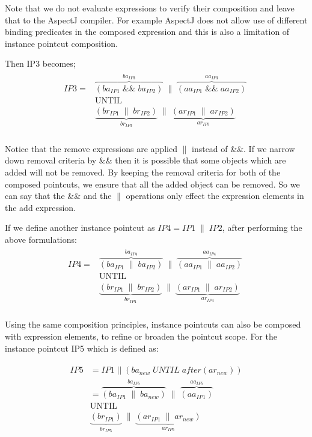 \documentclass{llncs}
\begin{document}
Note that we do not evaluate expressions to verify their composition and leave that to the AspectJ compiler. For example AspectJ does not allow use of different binding predicates in the composed expression and this is also a limitation of instance pointcut composition. 

Then IP3 becomes;
\begin{align}
\begin{split}
IP3 =& \overbrace{\left( ba_{IP1}\;\textrm{\&\&}\;ba_{IP2}\right)}^{ba_{IP3}}\;\|\;\overbrace{\left( aa_{IP1}\;\textrm{\&\&}\;aa_{IP2} \right)}^{aa_{IP3}}\;\\
&\textrm{UNTIL} \\
&\underbrace{\left( br_{IP1}\;\|\;br_{IP2}\right)}_{br_{IP3}}\;\|\;\underbrace{\left( ar_{IP1}\;\|\;ar_{IP2} \right)}_{ar_{IP3}}\;\\  
\label{ip3step}
\end{split}
\end{align}

Notice that the remove expressions are applied $\|$ instead of \&\&. If we narrow down removal criteria by \&\& then it is possible that some objects which are added will not be removed. By keeping the removal criteria for both of the composed pointcuts, we ensure that all the added object can be removed. So we can say that the \&\& and the $\|$ operations only effect the expression elements in the add expression.

If we define another instance pointcut as $ IP4 = IP1\;\|\;IP2$, after performing the above formulations:
\begin{align}
\begin{split}
IP4 =& \overbrace{\left( ba_{IP1}\;\|\;ba_{IP2}\right)}^{ba_{IP4}}\;\|\;\overbrace{\left( aa_{IP1}\;\|\;aa_{IP2} \right)}^{aa_{IP4}}\;\\
&\textrm{UNTIL} \\
&\underbrace{\left( br_{IP1}\;\|\;br_{IP2}\right)}_{br_{IP4}}\;\|\;\underbrace{\left( ar_{IP1}\;\|\;ar_{IP2} \right)}_{ar_{IP4}}\;\\  
\label{ip3step}
\end{split}
\end{align}

Using the same composition principles, instance pointcuts can also be composed with expression elements, to refine or broaden the pointcut scope. For the instance pointcut IP5 which is defined as:

\begin{align}
\begin{split}
IP5 & = IP1\;||\;(ba_{new}\;UNTIL\;after(ar_{new})) \\
   & = \overbrace{\left( ba_{IP1}\;\|\;ba_{new}\right)}^{ba_{IP5}}\;\|\;\overbrace{\left( aa_{IP1} \right)}^{aa_{IP5}}\;\\
&\textrm{UNTIL} \\
&\underbrace{\left( br_{IP1}\right)}_{br_{IP5}}\;\|\;\underbrace{\left( ar_{IP1}\;\|\;ar_{new} \right)}_{ar_{IP5}}\;\\  
\end{split}
\end{align}
\end{document}
